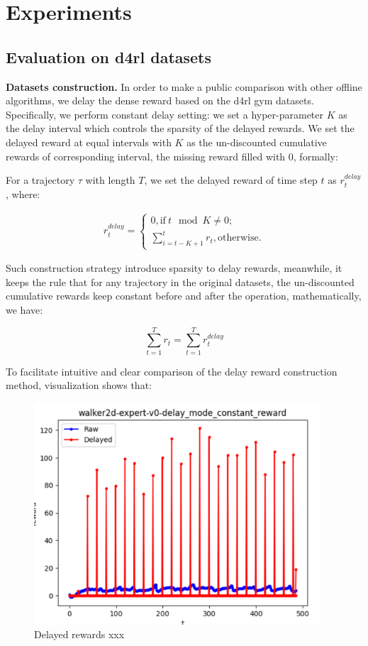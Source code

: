 \section{Experiments}

\subsection{Evaluation on d4rl datasets}

\textbf{Datasets construction.} In order to make a public comparison with other offline algorithms, we delay the dense reward based on the d4rl gym datasets. Specifically, we perform constant delay setting: we set a hyper-parameter $K$ as the delay interval which controls the sparsity of the delayed rewards. We set the delayed reward at equal intervals with $K$ as the un-discounted cumulative rewards of corresponding interval, the missing reward filled with 0, formally:

For a trajectory $\tau$ with length $T$, we set the delayed reward of time step $t$ as $r_t^{delay}$, where:

$$
\begin{aligned}
r_t^{delay} = \begin{cases}
0, \text{if} \ t \mod K \neq 0; \\
\sum_{i = t - K + 1}^t r_t, \text{otherwise}.
\end{cases}
\end{aligned}
$$

Such construction strategy introduce sparsity to delay rewards, meanwhile, it keeps the rule that for any trajectory in the original datasets, the un-discounted cumulative rewards keep constant before and after the operation, mathematically, we have:

$$
\sum_{t = 1}^{T} r_t = \sum_{t = 1}^{T} r_t^{delay}
$$

To facilitate intuitive and clear comparison of the delay reward construction method, visualization shows that:
\begin{figure}
    \centering
    \includegraphics[width=0.95\textwidth]{assets/image.png}
    \caption{Delayed rewards xxx}
    \label{fig:fig1}
\end{figure}

